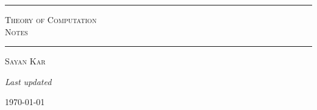 %	
%	
%	
%	
%	
%	
%	

\begin{titlepage}
	\thispagestyle{empty}
	
	\begin{center}
		
		\vspace*{3cm}
		
			\rule{0.85\textwidth}{0.6pt}
		
		\vspace{1.5cm}
		
		
		{\fontsize{42}{50}\selectfont
			\textsc{Theory of Computation\\[0.3em]
				Notes}\par}
		
		\vspace{1.2cm}
		
		\rule{0.85\textwidth}{0.6pt}
		
		\vspace{1.5cm}
		
		{\Large\textsc{Sayan Kar}\par}
		
	
		
		\vfill
		
		{\large
			\textit{Last updated}\par}
		
		\vspace{0.3cm}
		
		{\Large \today\par}
		
		\vspace*{1cm}
		
	\end{center}
\end{titlepage}